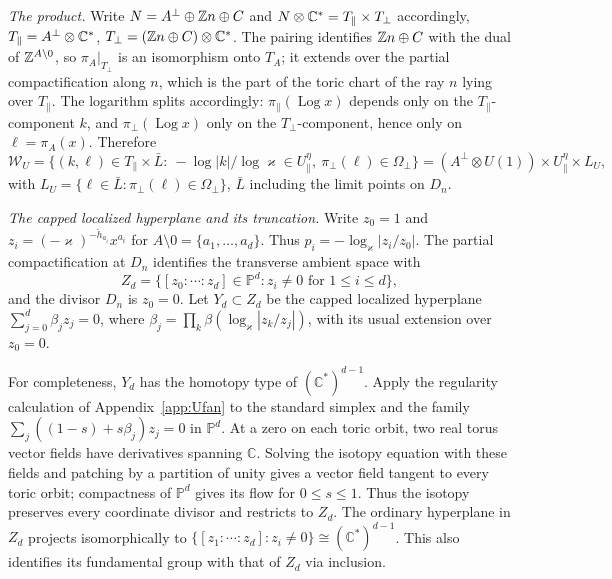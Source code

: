 \emph{The product.} Write $N=A^\perp\oplus\mathbb Z n\oplus C$ and $N\otimes\mathbb C^*=T_\parallel\times T_\perp$ accordingly, $T_\parallel=A^\perp\otimes\mathbb C^*$, $T_\perp=(\mathbb Z n\oplus C)\otimes\mathbb C^*$. The pairing identifies $\mathbb Z n\oplus C$ with the dual of $\mathbb Z^{A\setminus0}$, so $\pi_A|_{T_\perp}$ is an isomorphism onto $T_A$; it extends over the partial compactification along $n$, which is the part of the toric chart of the ray $n$ lying over $T_\parallel$. The logarithm splits accordingly: $\pi_\parallel(\operatorname{Log}x)$ depends only on the $T_\parallel$-component $k$, and $\pi_\perp(\operatorname{Log}x)$ only on the $T_\perp$-component, hence only on $\ell=\pi_A(x)$. Therefore
\[
\mathscr W_U=\{(k,\ell)\in T_\parallel\times\bar L:\ -\log|k|/\log \varkappa\in U_\parallel^\eta,\ \pi_\perp(\ell)\in\Omega_\perp\}=(A^\perp\otimes U(1))\times U_\parallel^\eta\times L_U,
\]
with $L_U=\{\ell\in\bar L:\pi_\perp(\ell)\in\Omega_\perp\}$, $\bar L$ including the limit points on $D_n$.

\emph{The capped localized hyperplane and its truncation.}
Write $z_0=1$ and $z_i=(-\varkappa)^{-\check h_{a_i}}x^{a_i}$ for
$A\setminus0=\{a_1,\ldots,a_d\}$. Thus $p_i=-\log_\varkappa|z_i/z_0|$.
The partial compactification at $D_n$ identifies the transverse ambient space with
\[
 Z_d=\{[z_0:\cdots:z_d]\in\mathbb P^d:z_i\ne0\text{ for }1\le i\le d\},
\]
and the divisor $D_n$ is $z_0=0$. Let $Y_d\subset Z_d$ be the capped localized
hyperplane $\sum_{j=0}^d\beta_jz_j=0$, where
$\beta_j=\prod_k\beta(\log_\varkappa|z_k/z_j|)$, with its usual extension over $z_0=0$.

For completeness, $Y_d$ has the homotopy type of $(\mathbb C^*)^{d-1}$.
Apply the regularity calculation of Appendix~\ref{app:Ufan} to the standard
simplex and the family $\sum_j((1-s)+s\beta_j)z_j=0$ in $\mathbb P^d$.
At a zero on each toric orbit, two real torus vector fields have derivatives
spanning $\mathbb C$. Solving the isotopy equation with these fields and
patching by a partition of unity gives a vector field tangent to every toric
orbit; compactness of $\mathbb P^d$ gives its flow for $0\le s\le1$.
Thus the isotopy preserves every coordinate divisor and restricts to $Z_d$.
The ordinary hyperplane in $Z_d$ projects isomorphically to
$\{[z_1:\cdots:z_d]:z_i\ne0\}\cong(\mathbb C^*)^{d-1}$.
This also identifies its fundamental group with that of $Z_d$ via inclusion.

